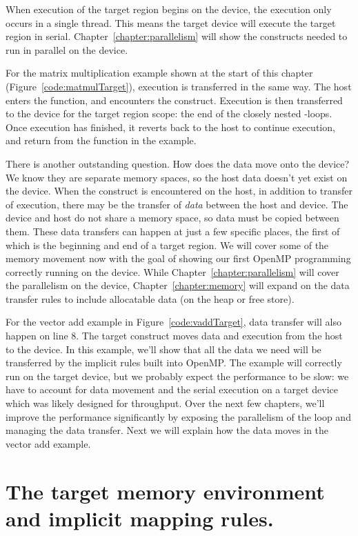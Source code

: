 When execution of the target region begins on the device, the execution only occurs in a single thread.
This means the target device will execute the target region in serial.
Chapter~\ref{chapter:parallelism} will show the constructs needed to run in parallel on the device.

For the matrix multiplication example shown at the start of this chapter (Figure~\ref{code:matmulTarget}), execution is transferred in the same way.
The host enters the function, and encounters the  construct.
Execution is then transferred to the device for the target region scope: the end of the closely nested -loops.
Once execution has finished, it reverts back to the host to continue execution, and return from the function in the example.


There is another outstanding question.
How does the data move onto the device?
We know they are separate memory spaces, so the host data doesn't yet exist on the device.
When the  construct is encountered on the host, in addition to transfer of execution, there may be the transfer of \emph{data} between the host and device.
The device and host do not share a memory space, so data must be copied between them.
These data transfers can happen at just a few specific places, the first of which is the beginning and end of a target region.
We will cover some of the memory movement now with the goal of showing our first OpenMP programming correctly running on the device.
While Chapter~\ref{chapter:parallelism} will cover the parallelism on the device, Chapter~\ref{chapter:memory} will expand on the data transfer rules to include allocatable data (on the heap or free store).

For the vector add example in Figure~\ref{code:vaddTarget}, data transfer will also happen on line 8.
The target construct moves data and execution from the host to the device.
In this example, we'll show that all the data we need will be transferred by the implicit rules built into OpenMP.
The example will correctly run on the target device, but we probably expect the performance to be slow: we have to account for data movement and the serial execution on a target device which was likely designed for throughput.
Over the next few chapters, we'll improve the performance significantly by exposing the parallelism of the loop and managing the data transfer.
Next we will explain how the data moves in the vector add example.


\section{The target memory environment and implicit mapping rules.}

